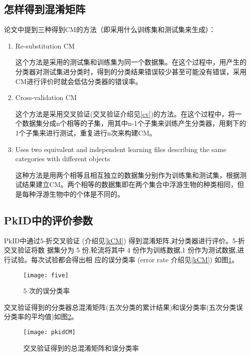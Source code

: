 \subsection{怎样得到混淆矩阵}
论文中提到三种得到CM的方法（即采用什么训练集和测试集来生成）：
    \begin{enumerate}
        \item Re-substitution CM
        
       这个方法是采用的测试集和训练集为同一个数据集。在这个过程中，用产生的分类器对测试集进分类时，得到的分类结果错误较少甚至可能没有错误，采用CM进行评价时就会低估分类器的错误率。
        \item Cross-validation CM
        
        这个方法是采用交叉验证(交叉验证介绍见\ref{cv})的方法。在这个过程中，将一个数据集分成n个相等的子集，用其中n-1个子集来训练产生分类器，用剩下的1个子集来进行测试，重复进行n次来构建CM。
        \item Uses two equivalent and independent learning files describing the same categories with different objects
        
        这种方法是用两个相等且相互独立的数据集分别作为训练集和测试集，根据测试结果建立CM。两个相等的数据集即在两个集合中浮游生物的种类相同，但是每种浮游生物中的个体是不同的。
    \end{enumerate}
    
\subsection{PkID中的评价参数}
PkID中通过5-折交叉验证 (介绍见\ref{kCM}) 得到混淆矩阵,对分类器进行评价。5-折交叉验证将数 据集分为 5 份,轮流将其中 4 份作为训练数据,1 份作为测试数据,进行试验。每次试验都会得出相 应的误分类率 (error rate 介绍见\ref{kCM}) 如图\ref{fig:five}。
    \begin{figure}[!ht]
      \centering 
        \texttt{[image: five]}
        \caption{5 次的误分类率}
        \label{fig:five}
    \end{figure}
    
    交叉验证得到的分类器总混淆矩阵(五次分类的累计结果)和误分类率(五次分类误分类率的平均值)如图\ref{fig:pkidCM}。
   \begin{figure}[!ht]
      \centering 
        \texttt{[image: pkidCM]}
        \caption{交叉验证得到的总混淆矩阵和误分类率}
        \label{fig:pkidCM}
    \end{figure}
    

    



